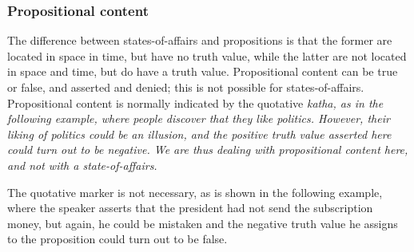 \subsubsection{Propositional content}\label{sec:func:Propositionalcontent}
The difference between states-of-affairs and propositions is that the  former are located in space in time, but have no truth value, while the latter are not located in space and time, but do have a truth value. Propositional content can be true or false, and asserted and denied; this is not possible for states-of-affairs. Propositional content is normally indicated by the quotative \em katha\em, as in the following example, where people discover that they like politics. However, their liking of politics could be an illusion, and the positive truth value asserted here could turn out to be negative. We are thus dealing with propositional content here, and not with a state-of-affairs.


The quotative marker is not necessary, as is shown in the following example, where the speaker asserts that the president had not send the subscription money, but again, he could be mistaken and the negative truth value he assigns to the proposition could turn out to be false.

 \\
%


